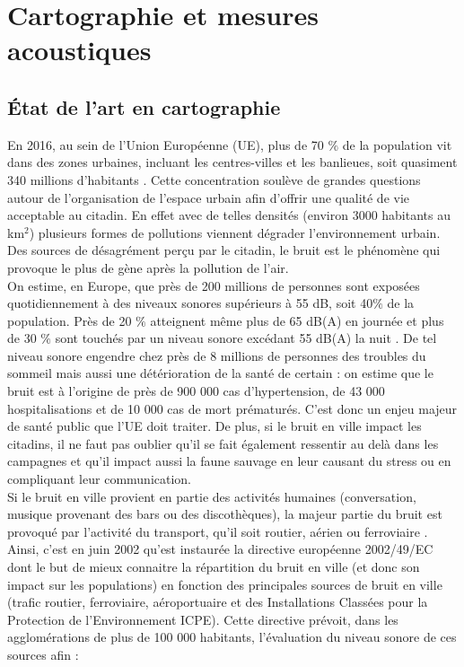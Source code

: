 %
%
%
%
%

\chapter{Cartographie et mesures acoustiques}
\thispagestyle{empty}

\section{État de l'art en cartographie}
En 2016, au sein de l'Union Européenne (UE), plus de 70 $\%$ de la population vit dans des zones urbaines, incluant les centres-villes et les banlieues, soit quasiment 340 millions d'habitants \cite{europ-commission_data_2017}. Cette concentration soulève de grandes questions autour de l'organisation de l'espace urbain afin d'offrir une qualité de vie acceptable au citadin. En effet avec de telles densités (environ 3000 habitants au km$^2$) plusieurs formes de pollutions viennent dégrader l'environnement urbain. Des sources de désagrément perçu par le citadin, le bruit est le phénomène qui provoque le plus de gène après la pollution de l'air. \\

On estime, en Europe, que près de 200 millions de personnes sont exposées quotidiennement à des niveaux sonores supérieurs à 55 dB, soit 40$\%$ de la population. Près de 20 $\%$ atteignent même plus de 65 dB(A) en journée et plus de 30 $\%$ sont touchés par un niveau sonore excédant 55 dB(A) la nuit \cite{who_burden_2017}. De tel niveau sonore engendre chez près de 8 millions de personnes des troubles du sommeil mais aussi une détérioration de la santé de certain : on estime que le bruit est à l'origine de près de 900 000 cas d'hypertension, de 43 000 hospitalisations et de 10 000 cas de mort prématurés. C'est donc un enjeu majeur de santé public que l'UE doit traiter. De plus, si le bruit en ville impact les citadins, il ne faut pas oublier qu'il se fait également ressentir au delà dans les campagnes et qu'il impact aussi la faune sauvage \cite{dutilleux_anthropogenic_2012} en leur causant du stress ou en compliquant leur communication. \\

Si le bruit en ville provient en partie des activités humaines (conversation, musique provenant des bars ou des discothèques), la majeur partie du bruit est provoqué par l'activité du transport, qu'il soit routier, aérien ou  ferroviaire \cite{zannin_characterization_2013}. Ainsi, c'est en juin 2002 qu'est instaurée la directive européenne 2002/49/EC \cite{directive} dont le but de mieux connaitre la répartition du bruit en ville (et donc son impact sur les populations) en fonction des principales sources de bruit en ville (trafic routier, ferroviaire, aéroportuaire et  des Installations Classées pour la Protection de l'Environnement ICPE). Cette directive prévoit, dans les agglomérations de plus de 100 000 habitants, l'évaluation du niveau sonore de ces sources afin :

